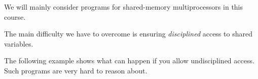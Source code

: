 \documentclass[notes,color]{sepslide0}
\begin{document}










\begin{slide}

We will mainly consider programs for shared-memory multiprocessors in this
course.

The main difficulty we have to overcome is ensuring \emph{disciplined} access
to shared variables.  

The following example shows what can happen if you allow undisciplined access.
Such programs are very hard to reason about.
\end{slide}
\end{document}
